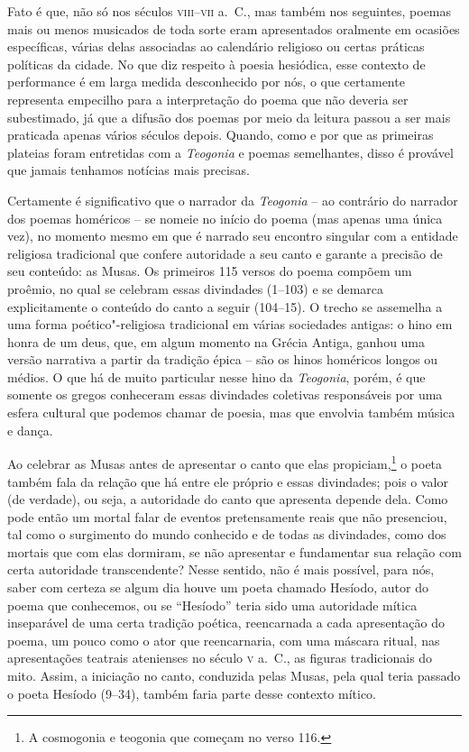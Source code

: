 Fato é que, não só nos séculos \textsc{viii--vii} a.~C., mas também nos
seguintes, poemas mais ou menos musicados de toda sorte eram apresentados
oralmente em ocasiões específicas, várias delas associadas ao calendário
religioso ou certas práticas políticas da cidade. No que diz respeito à
poesia hesiódica, esse contexto de performance é em larga medida desconhecido
por nós, o que certamente representa empecilho para a interpretação do poema
que não deveria ser subestimado, já que a difusão dos poemas por meio da
leitura passou a ser mais praticada apenas vários séculos depois. Quando, como
e por que as primeiras plateias foram entretidas com a \textit{Teogonia} e
poemas semelhantes, disso é provável que jamais tenhamos notícias mais
precisas.

Certamente é significativo que o narrador da \textit{Teogonia} – ao contrário
do narrador dos poemas homéricos – se nomeie no início do poema (mas apenas uma
única vez), no momento mesmo em que é narrado seu encontro singular com a
entidade religiosa tradicional que confere autoridade a seu canto e garante a
precisão de seu conteúdo: as Musas. Os primeiros 115 versos do poema compõem um
proêmio, no qual se celebram essas divindades (1--103) e se demarca
explicitamente o conteúdo do canto a seguir (104--15). O trecho se assemelha a
uma forma poético"-religiosa tradicional em várias sociedades antigas: o hino
em honra de um deus, que, em algum momento na Grécia Antiga, ganhou uma versão
narrativa a partir da tradição épica – são os hinos homéricos longos ou médios.
O que há de muito particular nesse hino da \textit{Teogonia}, porém, é que
somente os gregos conheceram essas divindades coletivas responsáveis por uma
esfera cultural que podemos chamar de poesia, mas que envolvia também música e
dança. 

Ao celebrar as Musas antes de apresentar o canto que elas propiciam,\footnote{ A
cosmogonia e teogonia que começam no verso 116.} o poeta também fala da
relação que há entre ele próprio e essas divindades; pois o valor (de verdade),
ou seja, a autoridade do canto que apresenta depende dela. Como pode então
um mortal falar de eventos pretensamente reais que não presenciou, tal como o
surgimento do mundo conhecido e de todas as divindades, como dos mortais
que com elas dormiram, se não apresentar e fundamentar sua relação com certa
autoridade transcendente? Nesse sentido, não é mais possível, para nós,
saber com certeza se algum dia houve um poeta chamado Hesíodo, autor do poema
que conhecemos, ou se “Hesíodo” teria sido uma autoridade mítica inseparável de
uma certa tradição poética, reencarnada a cada apresentação do poema, um pouco
como o ator que reencarnaria, com uma máscara ritual, nas apresentações
teatrais atenienses no século \textsc{v} a.~C., as figuras tradicionais do
mito. Assim, a iniciação no canto, conduzida pelas Musas, pela qual teria
passado o poeta Hesíodo (9--34), também faria parte desse contexto mítico.

